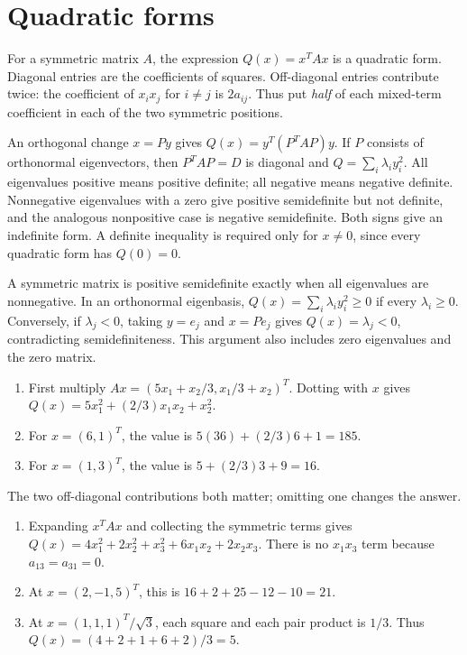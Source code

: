 \section{Quadratic forms}
For a symmetric matrix $A$, the expression $Q(x)=x^TAx$ is a quadratic
form. Diagonal entries are the coefficients of squares. Off-diagonal
entries contribute twice: the coefficient of $x_ix_j$ for $i\ne j$ is
$2a_{ij}$. Thus put \emph{half} of each mixed-term coefficient in each
of the two symmetric positions.

An orthogonal change $x=Py$ gives
$Q(x)=y^T(P^TAP)y$. If $P$ consists of orthonormal eigenvectors, then
$P^TAP=D$ is diagonal and $Q=\sum_i\lambda_i y_i^2$.
All eigenvalues positive means positive definite; all negative means negative
definite. Nonnegative eigenvalues with a zero give positive semidefinite
but not definite, and the analogous nonpositive case is negative semidefinite.
Both signs give an indefinite form. A definite inequality is required only
for $x\ne0$, since every quadratic form has $Q(0)=0$.

A symmetric matrix is positive semidefinite exactly when all eigenvalues
are nonnegative. In an orthonormal eigenbasis,
$Q(x)=\sum_i\lambda_i y_i^2\ge0$ if every $\lambda_i\ge0$.
Conversely, if $\lambda_j<0$, taking $y=e_j$ and $x=Pe_j$ gives
$Q(x)=\lambda_j<0$, contradicting semidefiniteness.
This argument also includes zero eigenvalues and the zero matrix.

\begin{enumerate}[label=(\alph*)]
\item First multiply $Ax=(5x_1+x_2/3,x_1/3+x_2)^T$.
Dotting with $x$ gives
$Q(x)=5x_1^2+(2/3)x_1x_2+x_2^2$.
\item For $x=(6,1)^T$, the value is $5(36)+(2/3)6+1=185$.
\item For $x=(1,3)^T$, the value is $5+(2/3)3+9=16$.
\end{enumerate}
The two off-diagonal contributions both matter; omitting one changes the answer.

\begin{enumerate}[label=(\alph*)]
\item Expanding $x^TAx$ and collecting the symmetric terms gives
$Q(x)=4x_1^2+2x_2^2+x_3^2+6x_1x_2+2x_2x_3$.
There is no $x_1x_3$ term because $a_{13}=a_{31}=0$.
\item At $x=(2,-1,5)^T$, this is $16+2+25-12-10=21$.
\item At $x=(1,1,1)^T/\sqrt3$, each square and each pair product is
$1/3$. Thus $Q(x)=(4+2+1+6+2)/3=5$.
\end{enumerate}

